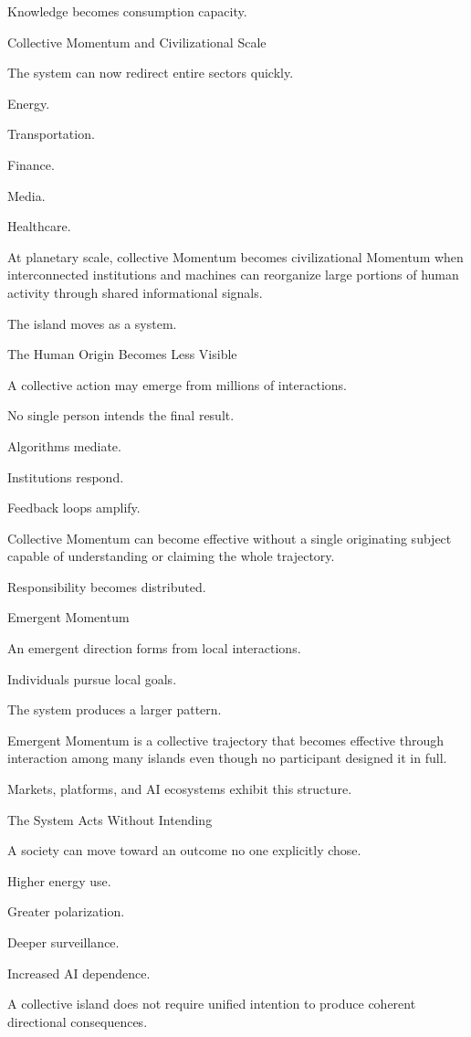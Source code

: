 Knowledge becomes consumption capacity.

Collective Momentum and Civilizational Scale

The system can now redirect entire sectors quickly.

Energy.

Transportation.

Finance.

Media.

Healthcare.

At planetary scale, collective Momentum becomes civilizational Momentum when interconnected institutions and machines can reorganize large portions of human activity through shared informational signals.

The island moves as a system.

The Human Origin Becomes Less Visible

A collective action may emerge from millions of interactions.

No single person intends the final result.

Algorithms mediate.

Institutions respond.

Feedback loops amplify.

Collective Momentum can become effective without a single originating subject capable of understanding or claiming the whole trajectory.

Responsibility becomes distributed.

Emergent Momentum

An emergent direction forms from local interactions.

Individuals pursue local goals.

The system produces a larger pattern.

Emergent Momentum is a collective trajectory that becomes effective through interaction among many islands even though no participant designed it in full.

Markets, platforms, and AI ecosystems exhibit this structure.

The System Acts Without Intending

A society can move toward an outcome no one explicitly chose.

Higher energy use.

Greater polarization.

Deeper surveillance.

Increased AI dependence.

A collective island does not require unified intention to produce coherent directional consequences.

